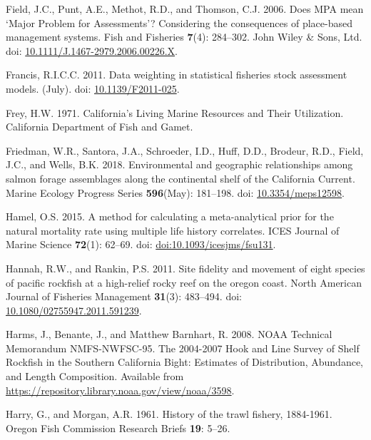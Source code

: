 \documentclass[
  english,
  a4paper,
]{article}
\newlength{\cslhangindent}
\newlength{\cslentryspacingunit} %
\newenvironment{CSLReferences}[2] %
 {%
  \setlength{\parindent}{0pt}
  \ifodd #1
  \let\oldpar\par
  \def\par{\hangindent=\cslhangindent\oldpar}
  \fi
  \setlength{\parskip}{#2\cslentryspacingunit}
 }%
 {}
\begin{document}
\begin{CSLReferences}{1}{0}
\leavevmode{}%
Field, J.C., Punt, A.E., Methot, R.D., and Thomson, C.J. 2006. {Does MPA mean `Major Problem for Assessments'? Considering the consequences of place-based management systems}. Fish and Fisheries \textbf{7}(4): 284--302. John Wiley \& Sons, Ltd. doi: \href{https://doi.org/10.1111/J.1467-2979.2006.00226.X}{10.1111/J.1467-2979.2006.00226.X}.

\leavevmode{}%
Francis, R.I.C.C. 2011. {Data weighting in statistical fisheries stock assessment models}. (July). doi: \href{https://doi.org/10.1139/F2011-025}{10.1139/F2011-025}.

\leavevmode{}%
Frey, H.W. 1971. {California's Living Marine Resources and Their Utilization. California Department of Fish and Gamet}.

\leavevmode{}%
Friedman, W.R., Santora, J.A., Schroeder, I.D., Huff, D.D., Brodeur, R.D., Field, J.C., and Wells, B.K. 2018. {Environmental and geographic relationships among salmon forage assemblages along the continental shelf of the California Current}. Marine Ecology Progress Series \textbf{596}(May): 181--198. doi: \href{https://doi.org/10.3354/meps12598}{10.3354/meps12598}.

\leavevmode{}%
Hamel, O.S. 2015. {A method for calculating a meta-analytical prior for the natural mortality rate using multiple life history correlates}. ICES Journal of Marine Science \textbf{72}(1): 62--69. doi: \href{https://doi.org/doi:10.1093/icesjms/fsu131}{doi:10.1093/icesjms/fsu131}.

\leavevmode{}%
Hannah, R.W., and Rankin, P.S. 2011. {Site fidelity and movement of eight species of pacific rockfish at a high-relief rocky reef on the oregon coast}. North American Journal of Fisheries Management \textbf{31}(3): 483--494. doi: \href{https://doi.org/10.1080/02755947.2011.591239}{10.1080/02755947.2011.591239}.

\leavevmode{}%
Harms, J., Benante, J., and Matthew Barnhart, R. 2008. {NOAA Technical Memorandum NMFS-NWFSC-95. The 2004-2007 Hook and Line Survey of Shelf Rockfish in the Southern California Bight: Estimates of Distribution, Abundance, and Length Composition}. Available from \url{https://repository.library.noaa.gov/view/noaa/3598}.

\leavevmode{}%
Harry, G., and Morgan, A.R. 1961. {History of the trawl fishery, 1884-1961}. Oregon Fish Commission Research Briefs \textbf{19}: 5--26.


\end{CSLReferences}
\end{document}
